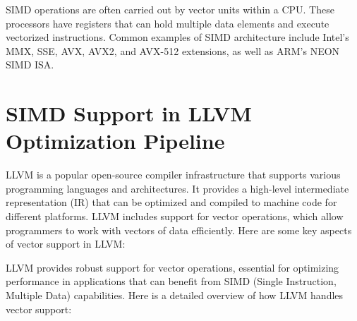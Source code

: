 SIMD operations are often carried out by vector units within a CPU.
These processors have registers that can hold multiple data elements
and execute vectorized instructions.
%
Common examples of SIMD
architecture include Intel’s MMX, SSE, AVX, AVX2, and AVX-512
extensions, as well as ARM’s NEON SIMD ISA.


\section{SIMD Support in LLVM Optimization Pipeline}
\label{sec:llvm-vectors}

LLVM is a popular open-source compiler infrastructure that supports
various programming languages and architectures. It provides a
high-level intermediate representation (IR) that can be optimized and
compiled to machine code for different platforms. LLVM includes
support for vector operations, which allow programmers to work with
vectors of data efficiently. Here are some key aspects of vector
support in LLVM:

LLVM provides robust support for vector operations, essential for
optimizing performance in applications that can benefit from SIMD
(Single Instruction, Multiple Data) capabilities. Here is a detailed
overview of how LLVM handles vector support:

